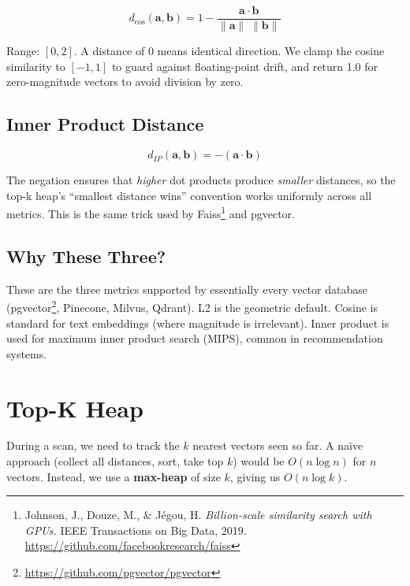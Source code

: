 \documentclass[12pt, a4paper]{report}
\begin{document}
\[
d_{\cos}(\mathbf{a}, \mathbf{b}) = 1 - \frac{\mathbf{a} \cdot \mathbf{b}}
    {\|\mathbf{a}\| \; \|\mathbf{b}\|}
\]

Range: $[0, 2]$. A distance of 0 means identical direction. We clamp the
cosine similarity to $[-1, 1]$ to guard against floating-point drift, and
return 1.0 for zero-magnitude vectors to avoid division by zero.

\subsection{Inner Product Distance}

\[
d_{IP}(\mathbf{a}, \mathbf{b}) = -(\mathbf{a} \cdot \mathbf{b})
\]

The negation ensures that \textit{higher} dot products produce
\textit{smaller} distances, so the top-k heap's ``smallest distance wins''
convention works uniformly across all metrics. This is the same trick used by
Faiss\footnote{Johnson, J., Douze, M., \& J{\'e}gou, H. \textit{Billion-scale
similarity search with GPUs.} IEEE Transactions on Big Data, 2019.
\url{https://github.com/facebookresearch/faiss}} and pgvector.

\subsection{Why These Three?}

These are the three metrics supported by essentially every vector database
(pgvector\footnote{\url{https://github.com/pgvector/pgvector}},
Pinecone, Milvus, Qdrant). L2 is the geometric default. Cosine is standard
for text embeddings (where magnitude is irrelevant). Inner product is used
for maximum inner product search (MIPS), common in recommendation systems.


\section{Top-K Heap}

During a scan, we need to track the $k$ nearest vectors seen so far. A
na{\"i}ve approach (collect all distances, sort, take top $k$) would be
$O(n \log n)$ for $n$ vectors. Instead, we use a \textbf{max-heap} of size
$k$, giving us $O(n \log k)$.
\end{document}
